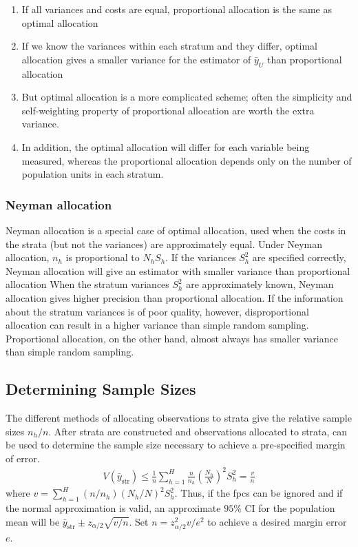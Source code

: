 \documentclass[a4paper,twoside,11pt]{article}
\begin{document}
\begin{enumerate}
    \item If all variances and costs are equal, proportional allocation is the same as optimal allocation
    \item If we know the variances within each stratum and they differ, optimal allocation gives a smaller variance for the estimator of $\bar{y}_U$ than proportional allocation
    \item But optimal allocation is a more complicated scheme; often the simplicity and self-weighting property of proportional allocation are worth the extra variance. \item In addition, the optimal allocation will differ for each variable being measured, whereas the proportional allocation depends only on the number of population units in each stratum. 
\end{enumerate}
\subsubsection{Neyman allocation}
Neyman allocation is a special case of optimal allocation, used when the costs in the strata (but not the variances) are approximately equal. Under Neyman allocation, $n_h$ is proportional to $N_hS_h$. If the variances $S_h^2$ are specified correctly, Neyman allocation will give an estimator with smaller variance than proportional allocation
\newline
\newline
When the stratum variances $S_h^2$ are approximately known, Neyman allocation gives higher precision than proportional allocation. If the information about the stratum variances is of poor quality, however, disproportional allocation can result in a higher variance than simple random sampling. Proportional allocation, on the other hand, almost always has smaller variance than simple random sampling.
\subsection{Determining Sample Sizes}
The different methods of allocating observations to strata give the relative sample sizes $n_h/n$. After strata are constructed and observations allocated to strata, can be used to determine the sample size necessary to achieve a pre-specified margin of error. 
\begin{equation*}
\begin{aligned}
V(\bar{y}_{\text{str}}) \le \frac{1}{n} \sum^H_{h=1} \frac{n}{n_h} (\frac{N_h}{N})^2 S_h^2 = \frac{v}{n}
\end{aligned}
\end{equation*}
where $v = \sum^H_{h=1} (n/n_h)(N_h/N)^2 S_h^2$. Thus, if the fpcs can be ignored and if the normal approximation is valid, an approximate $95\%$ CI for the population mean will
be $\bar{y}_{\text{str}} \pm z_{\alpha/2} \sqrt{v/n}$. Set $n = z_{\alpha/2}^2 v/e^2$ to achieve a desired margin error $e$. 
\end{document}
